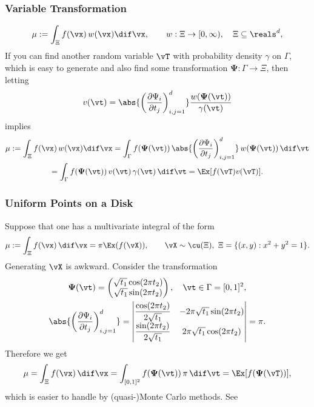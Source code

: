 \documentclass[10pt,compress,xcolor={usenames,dvipsnames}]{beamer} %
\newcommand{\vPsi}{\boldsymbol{\Psi}}
\begin{document}
\begin{frame}
\frametitle{Variable Transformation}
\[
\mu :=  \int_{\Xi} f(\vx) \, w(\vx) \dif \vx, \qquad w:\Xi \to [0,\infty),\quad \Xi \subseteq \reals^d,
\]
If you can find another random variable $\vT$ with probability density $\gamma$ on $\Gamma$, which is \alert{easy to generate} and also find some transformation $\vPsi:\Gamma \to \Xi$, then letting 
\[
v(\vt) = \abs{\left(\frac{\partial \Psi_i}{\partial t_j} \right)_{i,j=1}^d} \frac{ w(\vPsi(\vt))}{\gamma(\vt)}
\]
implies 
\begin{multline*}
\mu  := \int_{\Xi} f(\vx) \, w(\vx) \dif \vx = \int_{\Gamma} f(\vPsi(\vt)) \, \abs{\left(\frac{\partial \Psi_i}{\partial t_j} \right)_{i,j=1}^d} \, w(\vPsi(\vt)) \, \dif \vt \\
= \int_{\Gamma} f(\vPsi(\vt)) \, v(\vt)  \, \gamma(\vt) \, \dif \vt = \Ex[f(\vT)v(\vT)].
\end{multline*}

\end{frame}

\begin{frame}
\frametitle{Uniform Points on a Disk}
\vspace{-3ex}
Suppose that one has a multivariate integral of the form 
\[
\mu :=  \int_{\Xi} f(\vx) \, \dif \vx = \pi \Ex(f(\vX)),  \qquad \vX \sim \cu(\Xi), \ \Xi = \{(x,y) : x^2 + y^2 =1\}.
\]
Generating $\vX$ is  awkward.  Consider the transformation
\begin{gather*}
\vPsi(\vt) = \begin{pmatrix} \sqrt{t_1} \cos(2\pi t_2) \\ \sqrt{t_1} \sin(2\pi t_2) \end{pmatrix}, \quad \vt \in \Gamma = [0,1]^2,\\
\abs{\left(\frac{\partial \Psi_i}{\partial t_j} \right)_{i,j=1}^d} = \begin{vmatrix} \displaystyle \frac{\cos(2 \pi t_2)}{2\sqrt{t_1}}  & -2 \pi \sqrt{t_1} \sin(2 \pi t_2) \\ \displaystyle \frac{\sin(2 \pi t_2)}{2\sqrt{t_1}}  & 2 \pi \sqrt{t_1} \cos(2 \pi t_2) \end{vmatrix} = \pi.
\end{gather*}
Therefore we get
\begin{equation*}
\mu  = \int_{\Xi} f(\vx) \, \dif \vx = \int_{[0,1]^2} f(\vPsi(\vt)) \, \pi \,  \dif \vt = \Ex[f(\vPsi(\vT))],
\end{equation*}
which is easier to handle by (quasi-)Monte Carlo methods.  See 
\end{frame}
\end{document}
